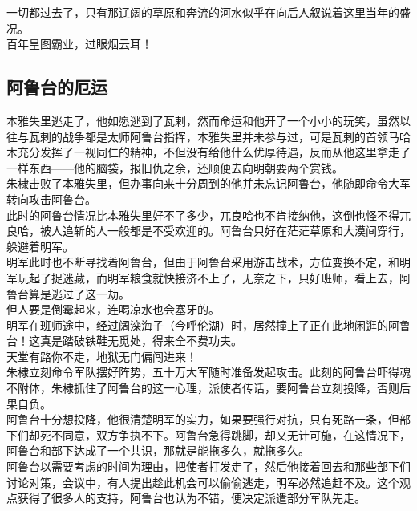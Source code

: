 \begin{multicols}{\theparacolNo}
一切都过去了，只有那辽阔的草原和奔流的河水似乎在向后人叙说着这里当年的盛况。\\

百年皇图霸业，过眼烟云耳！\\

\subsection{阿鲁台的厄运}
本雅失里逃走了，他如愿逃到了瓦剌，然而命运和他开了一个小小的玩笑，虽然以往与瓦剌的战争都是太师阿鲁台指挥，本雅失里并未参与过，可是瓦剌的首领马哈木充分发挥了一视同仁的精神，不但没有给他什么优厚待遇，反而从他这里拿走了一样东西——他的脑袋，报旧仇之余，还顺便去向明朝要两个赏钱。\\

朱棣击败了本雅失里，但办事向来十分周到的他并未忘记阿鲁台，他随即命令大军转向攻击阿鲁台。\\

此时的阿鲁台情况比本雅失里好不了多少，兀良哈也不肯接纳他，这倒也怪不得兀良哈，被人追斩的人一般都是不受欢迎的。阿鲁台只好在茫茫草原和大漠间穿行，躲避着明军。\\

明军此时也不断寻找着阿鲁台，但由于阿鲁台采用游击战术，方位变换不定，和明军玩起了捉迷藏，而明军粮食就快接济不上了，无奈之下，只好班师，看上去，阿鲁台算是逃过了这一劫。\\

但人要是倒霉起来，连喝凉水也会塞牙的。\\

明军在班师途中，经过阔滦海子（今呼伦湖）时，居然撞上了正在此地闲逛的阿鲁台！这真是踏破铁鞋无觅处，得来全不费功夫。\\

天堂有路你不走，地狱无门偏闯进来！\\

朱棣立刻命令军队摆好阵势，五十万大军随时准备发起攻击。此刻的阿鲁台吓得魂不附体，朱棣抓住了阿鲁台的这一心理，派使者传话，要阿鲁台立刻投降，否则后果自负。\\

阿鲁台十分想投降，他很清楚明军的实力，如果要强行对抗，只有死路一条，但部下们却死不同意，双方争执不下。阿鲁台急得跳脚，却又无计可施，在这情况下，阿鲁台和部下达成了一个共识，那就是能拖多久，就拖多久。\\

阿鲁台以需要考虑的时间为理由，把使者打发走了，然后他接着回去和那些部下们讨论对策，会议中，有人提出趁此机会可以偷偷逃走，明军必然追赶不及。这个观点获得了很多人的支持，阿鲁台也认为不错，便决定派遣部分军队先走。\\


\end{multicols}

